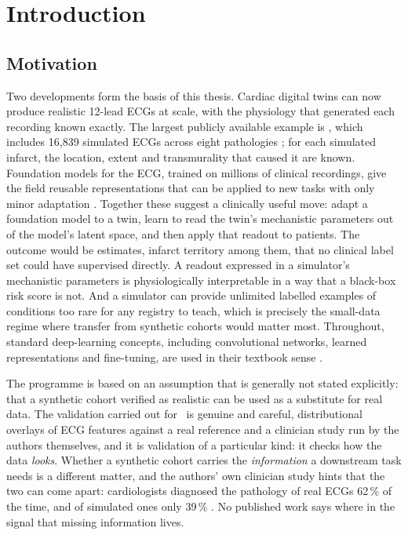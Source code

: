 \chapter{Introduction}
\label{ch:introduction}

\section{Motivation}
\label{sec:intro-motivation}

Two developments form the basis of this thesis. Cardiac digital twins can now produce realistic 12-lead ECGs at scale, with the physiology that generated each recording known exactly. The largest publicly available example is \medalcare, which includes 16,839 simulated ECGs across eight pathologies \citep{gillette2023medalcare}; for each simulated infarct, the location, extent and transmurality that caused it are known. Foundation models for the ECG, trained on millions of clinical recordings, give the field reusable representations that can be applied to new tasks with only minor adaptation \citep{li2024ecgfounder}. Together these suggest a clinically useful move: adapt a foundation model to a twin, learn to read the twin's mechanistic parameters out of the model's latent space, and then apply that readout to patients. The outcome would be estimates, infarct territory among them, that no clinical label set could have supervised directly. A readout expressed in a simulator's mechanistic parameters is physiologically interpretable in a way that a black-box risk score is not. And a simulator can provide unlimited labelled examples of conditions too rare for any registry to teach, which is precisely the small-data regime where transfer from synthetic cohorts would matter most. Throughout, standard deep-learning concepts, including convolutional networks, learned representations and fine-tuning, are used in their textbook sense \citep{goodfellow2016deep}.

The programme is based on an assumption that is generally not stated explicitly: that a synthetic cohort verified as realistic can be used as a substitute for real data. The validation carried out for \medalcare\ is genuine and careful, distributional overlays of ECG features against a real reference and a clinician study run by the authors themselves, and it is validation of a particular kind: it checks how the data \emph{looks}. Whether a synthetic cohort carries the \emph{information} a downstream task needs is a different matter, and the authors' own clinician study hints that the two can come apart: cardiologists diagnosed the pathology of real ECGs 62\,\% of the time, and of simulated ones only 39\,\% \citep{gillette2023medalcare}. No published work says where in the signal that missing information lives.

